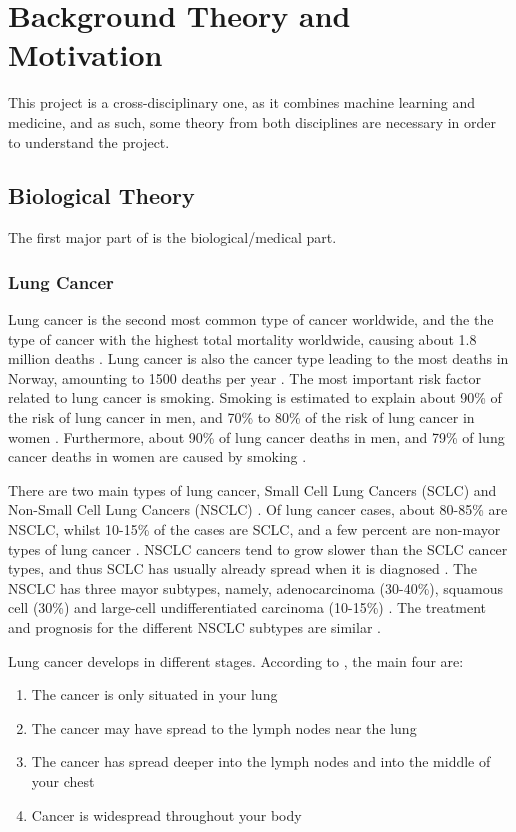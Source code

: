 \chapter{Background Theory and Motivation}\label{T-B}
\label{cha:TheoryAndBackground}

This project is a cross-disciplinary one, as it combines machine learning and medicine, and as such, some theory from both disciplines are necessary in order to understand the project.

\section{Biological Theory}
\label{sec:bio_theory}

The first major part of is the biological/medical part.

\subsection{Lung Cancer}
\label{subsec:lung_cancer}

Lung cancer is the second most common type of cancer worldwide, and the the type of cancer with the highest total mortality worldwide, causing about 1.8 million deaths \citep{globalkreftforekomst}. Lung cancer is also the cancer type leading to the most deaths in Norway, amounting to 1500 deaths per year \citep{kreftnorge}. The most important risk factor related to lung cancer is smoking. Smoking is estimated to explain about 90\% of the risk of lung cancer in men, and 70\% to 80\% of the risk of lung cancer in women \citep{roykingrisiko}. Furthermore, about 90\% of lung cancer deaths in men, and 79\% of lung cancer deaths in women are caused by smoking \citep{roykingdod}.

There are two main types of lung cancer, Small Cell Lung Cancers (SCLC) and Non-Small Cell Lung Cancers (NSCLC) \citep{nsclcvsclc}. Of lung cancer cases, about 80-85\% are NSCLC, whilst 10-15\% of the cases are SCLC, and a few percent are non-mayor types of lung cancer \citep{nsclcvsclc2}. NSCLC cancers tend to grow slower than the SCLC cancer types, and thus SCLC has usually already spread when it is diagnosed \citep{nsclcvsclc2}. The NSCLC has three mayor subtypes, namely, adenocarcinoma (30-40\%), squamous cell (30\%) and large-cell undifferentiated carcinoma (10-15\%) \citep{nsclcvsclc}. The treatment and prognosis for the different NSCLC subtypes are similar \citep{nsclcvsclc2}.

Lung cancer develops in different stages. According to \citet{cancerstages}, the main four are:
\begin{enumerate}
    \item The cancer is only situated in your lung
    \item The cancer may have spread to the lymph nodes near the lung
    \item The cancer has spread deeper into the lymph nodes and into the middle of your chest
    \item Cancer is widespread throughout your body
\end{enumerate}

